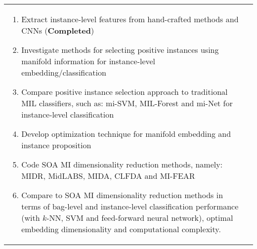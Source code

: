 \begin{longtable}{|p{}|p{}|}
\begin{enumerate}
		\item Extract instance-level features from hand-crafted methods and CNNs (\textbf{Completed})
		
		\item Investigate methods for selecting positive instances using manifold information for instance-level embedding/classification
	
		\item Compare positive instance selection approach to traditional MIL classifiers, such as: mi-SVM, MIL-Forest and mi-Net for instance-level classification 
		
		\item Develop optimization technique for manifold embedding and instance proposition
		
		\item Code SOA MI dimensionality reduction methods, namely: MIDR, MidLABS, MIDA, CLFDA and MI-FEAR
		
		\item Compare to SOA MI dimensionality reduction methods in terms of bag-level and instance-level classification performance (with $k$-NN, SVM and feed-forward neural network), optimal embedding dimensionality and computational complexity.
		

\end{enumerate}
\end{longtable}
